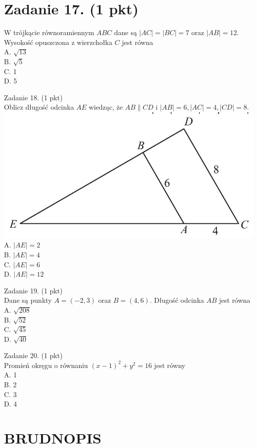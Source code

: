 \documentclass[10pt]{article}
\begin{document}
\section*{Zadanie 17. (1 pkt)}
W trójkącie równoramiennym \(A B C\) dane są \(|A C|=|B C|=7\) oraz \(|A B|=12\). Wysokość opuszczona z wierzchołka \(C\) jest równa\\
A. \(\sqrt{13}\)\\
B. \(\sqrt{5}\)\\
C. 1\\
D. 5

Zadanie 18. (1 pkt)\\
Oblicz długość odcinka \(A E\) wiedząc, że \(A B \| C D\) i \(|A B|=6,|A C|=4,|C D|=8\).\\
\includegraphics[max width=\textwidth, center]{2024_11_21_ad52a81220b9b2239458g-06(1)}\\
A. \(|A E|=2\)\\
B. \(|A E|=4\)\\
C. \(|A E|=6\)\\
D. \(|A E|=12\)

Zadanie 19. (1 pkt)\\
Dane są punkty \(A=(-2,3)\) oraz \(B=(4,6)\). Długość odcinka \(A B\) jest równa\\
A. \(\sqrt{208}\)\\
B. \(\sqrt{52}\)\\
C. \(\sqrt{45}\)\\
D. \(\sqrt{40}\)

Zadanie 20. (1 pkt)\\
Promień okręgu o równaniu \((x-1)^{2}+y^{2}=16\) jest równy\\
A. 1\\
B. 2\\
C. 3\\
D. 4

\section*{BRUDNOPIS}
\end{document}
